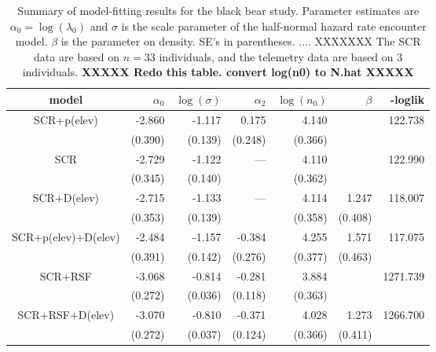 \begin{table}
\centering
\caption{
Summary of model-fitting results for the black bear study. Parameter
estimates are $\alpha_{0} = \log(\lambda_{0})$ and $\sigma$ is the
scale parameter of the half-normal hazard rate encounter
model. $\beta$ is the parameter on density. SE's in parentheses. .... XXXXXXX
The SCR data are based on $n=33$ individuals, and the telemetry data
are based on 3 individuals. 
{\bf XXXXX Redo this table. convert log(n0) to N.hat XXXXX}
}
\begin{tabular}{c|rrrrrr}
\hline \hline
model         & $\alpha_0$ & $\log(\sigma)$ & $\alpha_{2}$ & $\log(n_{0})$ &
$\beta$       & -loglik                                                                         \\ \hline
SCR+p(elev)      & -2.860    & -1.117        & 0.175       & 4.140        &        & 122.738  \\
             &  (0.390)     & (0.139)       & (0.248)       & (0.366)        &        &           \\
 SCR          & -2.729    & -1.122        & ---          & 4.110        &        & 122.990  \\
              & (0.345)     & (0.140)       &              & (0.362)        &        &           \\
SCR+D(elev)      & -2.715    & -1.133        & ---          & 4.114        & 1.247 & 118.007  \\
              & (0.353)     & (0.139)       &              & (0.358)    & (0.408) &           \\
SCR+p(elev)+D(elev) & -2.484    & -1.157        & -0.384      & 4.255        & 1.571 & 117.075  \\
              & (0.391)     & (0.142)       & (0.276)       & (0.377)   & (0.463) &           \\
SCR+RSF       & -3.068    & -0.814        & -0.281      & 3.884        &        & 1271.739 \\
              & (0.272)    & (0.036)         & (0.118)       & (0.363)        &        &           \\
SCR+RSF+D(elev)  & -3.070    & -0.810        & -0.371      & 4.028        & 1.273 & 1266.700 \\
              & (0.272)    & (0.037)         & (0.124)       & (0.366)        & (0.411) &           \\
\hline
\end{tabular}
\label{tab.nyresults}
\end{table}



